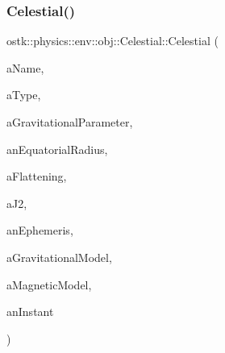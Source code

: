 \subsubsection{\texorpdfstring{Celestial()}{Celestial()}\hspace{0.1cm}{\footnotesize\ttfamily [1/2]}}
{\footnotesize\ttfamily ostk\+::physics\+::env\+::obj\+::\+Celestial\+::\+Celestial (\begin{DoxyParamCaption}\item[{const String \&}]{a\+Name,  }\item[{const \hyperlink{classostk_1_1physics_1_1env_1_1obj_1_1_celestial_aa0711d887522b35b2b3630156d912779}{Celestial\+::\+Type} \&}]{a\+Type,  }\item[{const \hyperlink{classostk_1_1physics_1_1units_1_1_derived}{Derived} \&}]{a\+Gravitational\+Parameter,  }\item[{const \hyperlink{classostk_1_1physics_1_1units_1_1_length}{Length} \&}]{an\+Equatorial\+Radius,  }\item[{const Real \&}]{a\+Flattening,  }\item[{const Real \&}]{a\+J2,  }\item[{const Shared$<$ \hyperlink{classostk_1_1physics_1_1env_1_1_ephemeris}{Ephemeris} $>$ \&}]{an\+Ephemeris,  }\item[{const Shared$<$ \hyperlink{namespaceostk_1_1physics_1_1env_1_1obj_a50c0bc72e8880f2fa2a910a81e050c97}{Gravitational\+Model} $>$ \&}]{a\+Gravitational\+Model,  }\item[{const Shared$<$ \hyperlink{namespaceostk_1_1physics_1_1env_1_1obj_a11552c1290e2f6b4693ea00c2df2c80d}{Magnetic\+Model} $>$ \&}]{a\+Magnetic\+Model,  }\item[{const \hyperlink{classostk_1_1physics_1_1time_1_1_instant}{Instant} \&}]{an\+Instant }\end{DoxyParamCaption})}

\mbox{\label{classostk_1_1physics_1_1env_1_1obj_1_1_celestial_a9519c2dacaeaf7b67fa7cae77eab427e}} 
